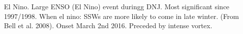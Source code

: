 El Nino. Large ENSO (El Nino) event duringg DNJ. Most significant since 1997/1998.
When el nino: SSWs are more likely to come in late winter. (From Bell et al.
2008). Onset March 2nd 2016. Preceded by  intense vortex. 
